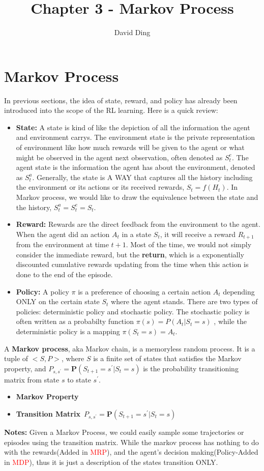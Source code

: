 \documentclass{article}
\title{Chapter 3 - Markov Process}
\author{David Ding}
\begin{document}
\maketitle

\section{Markov Process}
In previous sections, the idea of state, reward, and policy has already been introduced into the scope of the RL learning. Here is a quick review:
\begin{itemize}
    \item \textbf{State:} A state is kind of like the depiction of all the information the agent and environment carrys. The environment state is the private 
    representation of environment like how much rewards will be given to the agent or what might be observed in the agent next observation, often denoted as $S_t^e$.
    The agent state is the information the agent has about the environment, denoted as $S_t^a$. Generally, the state is A WAY that captures all the history including the environment
    or its actions or its received rewards, $S_t = f(H_t)$. In Markov process, we would like to draw the equivalence between the state and the history, $S_t^a = S_t^e = S_t$.
    \item \textbf{Reward:} Rewards are the direct feedback from the environment to the agent. When the agent did an action $A_t$ in a state $S_t$, it will receive a reward
    $R_{t+1}$ from the environment at time $t+1$. Most of the time, we would not simply consider the immediate reward, but the \textbf{return}, which is a exponentially discounted cumulative
    rewards updating from the time when this action is done to the end of the episode. 
    \item \textbf{Policy:} A policy $\pi$ is a preference of choosing a certain action $A_t$ depending ONLY on the certain state $S_t$ where the agent stands.
    There are two types of policies: deterministic policy and stochastic policy. The stochastic policy is often written as a probabilty function $\pi(s) = P(A_t|S_t=s)$
    , while the deterministic policy is a mapping $\pi(S_t = s) = A_t$.
\end{itemize}
\vspace{3em}
A \textbf{Markov process}, aka Markov chain, is a memoryless random process. It is a tuple of $<S, P>$, where $S$ is a finite set of states that satisfies the Markov property, 
and $P_{s, s^{'}} = \mathbf{P}(S_{t+1} = s^{'}|S_t = s)$ is the probability transitioning matrix from state $s$ to state $s^{'}$. 
\begin{itemize}
    \item \textbf{Markov Property}
    \item \textbf{Transition Matrix}~$P_{s, s^{'}} = \mathbf{P}(S_{t+1} = s^{'}|S_t = s)$
\end{itemize}
\vspace{2em}
\textbf{Notes:} Given a Markov Process, we could easily sample some trajectories or episodes using the transition matrix. While the markov process has nothing
    to do with the rewards(Added in \textcolor{red}{MRP}), and the agent's decision making(Policy-Added in \textcolor{red}{MDP}), thus it is just a description of the states transition ONLY.
\end{document}
